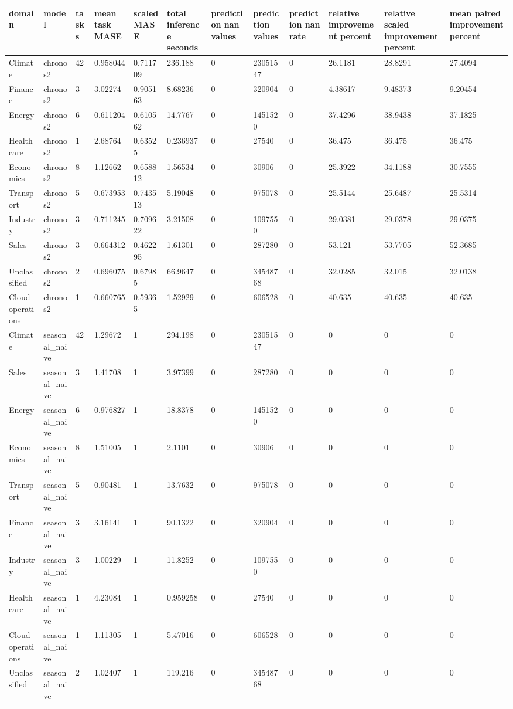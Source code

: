 \begin{tabular}{llllllllllll}
\toprule
domain & model & tasks & mean task MASE & scaled MASE & total inference seconds & prediction nan values & prediction values & prediction nan rate & relative improvement percent & relative scaled improvement percent & mean paired improvement percent \\
\midrule
Climate & chronos2 & 42 & 0.958044 & 0.711709 & 236.188 & 0 & 23051547 & 0 & 26.1181 & 28.8291 & 27.4094 \\
Finance & chronos2 & 3 & 3.02274 & 0.905163 & 8.68236 & 0 & 320904 & 0 & 4.38617 & 9.48373 & 9.20454 \\
Energy & chronos2 & 6 & 0.611204 & 0.610562 & 14.7767 & 0 & 1451520 & 0 & 37.4296 & 38.9438 & 37.1825 \\
Healthcare & chronos2 & 1 & 2.68764 & 0.63525 & 0.236937 & 0 & 27540 & 0 & 36.475 & 36.475 & 36.475 \\
Economics & chronos2 & 8 & 1.12662 & 0.658812 & 1.56534 & 0 & 30906 & 0 & 25.3922 & 34.1188 & 30.7555 \\
Transport & chronos2 & 5 & 0.673953 & 0.743513 & 5.19048 & 0 & 975078 & 0 & 25.5144 & 25.6487 & 25.5314 \\
Industry & chronos2 & 3 & 0.711245 & 0.709622 & 3.21508 & 0 & 1097550 & 0 & 29.0381 & 29.0378 & 29.0375 \\
Sales & chronos2 & 3 & 0.664312 & 0.462295 & 1.61301 & 0 & 287280 & 0 & 53.121 & 53.7705 & 52.3685 \\
Unclassified & chronos2 & 2 & 0.696075 & 0.67985 & 66.9647 & 0 & 34548768 & 0 & 32.0285 & 32.015 & 32.0138 \\
Cloud operations & chronos2 & 1 & 0.660765 & 0.59365 & 1.52929 & 0 & 606528 & 0 & 40.635 & 40.635 & 40.635 \\
Climate & seasonal\_naive & 42 & 1.29672 & 1 & 294.198 & 0 & 23051547 & 0 & 0 & 0 & 0 \\
Sales & seasonal\_naive & 3 & 1.41708 & 1 & 3.97399 & 0 & 287280 & 0 & 0 & 0 & 0 \\
Energy & seasonal\_naive & 6 & 0.976827 & 1 & 18.8378 & 0 & 1451520 & 0 & 0 & 0 & 0 \\
Economics & seasonal\_naive & 8 & 1.51005 & 1 & 2.1101 & 0 & 30906 & 0 & 0 & 0 & 0 \\
Transport & seasonal\_naive & 5 & 0.90481 & 1 & 13.7632 & 0 & 975078 & 0 & 0 & 0 & 0 \\
Finance & seasonal\_naive & 3 & 3.16141 & 1 & 90.1322 & 0 & 320904 & 0 & 0 & 0 & 0 \\
Industry & seasonal\_naive & 3 & 1.00229 & 1 & 11.8252 & 0 & 1097550 & 0 & 0 & 0 & 0 \\
Healthcare & seasonal\_naive & 1 & 4.23084 & 1 & 0.959258 & 0 & 27540 & 0 & 0 & 0 & 0 \\
Cloud operations & seasonal\_naive & 1 & 1.11305 & 1 & 5.47016 & 0 & 606528 & 0 & 0 & 0 & 0 \\
Unclassified & seasonal\_naive & 2 & 1.02407 & 1 & 119.216 & 0 & 34548768 & 0 & 0 & 0 & 0 \\
\bottomrule
\end{tabular}
